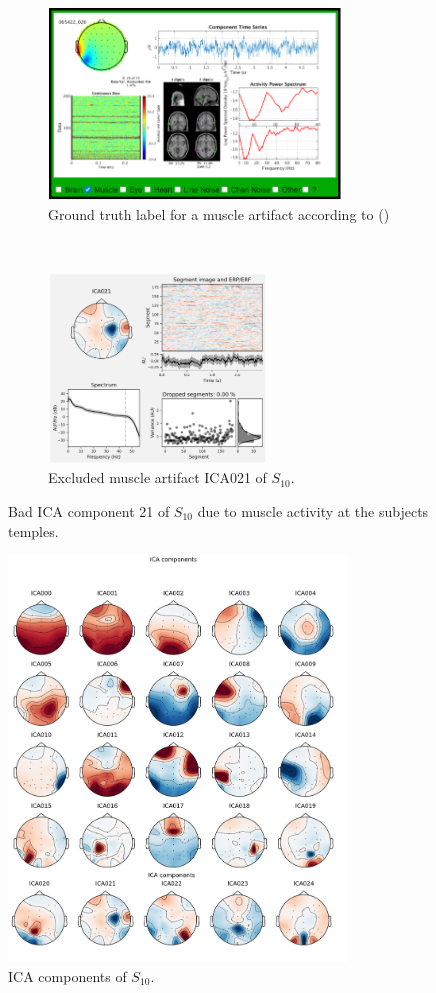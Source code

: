 \documentclass[a4paper]{article}
\newcommand{\caay}[2][]{
\citeauthor{#2} (\citeyear[#1]{#2})\xspace
}
\begin{document}
\begin{figure}[tbh!] 
\centering
 \begin{subfigure}[t]{0.5\textwidth}
        \centering
        \includegraphics[height=2.0in]{ica10AnalysisLabel.png}
\caption{Ground truth label for a muscle artifact according to \caay{pion-tonachini}}
\end{subfigure}%
    ~ 
\begin{subfigure}[t]{0.5\textwidth}
        \centering
        \includegraphics[height=2.0in]{ica10Analysis.png}
        \caption{Excluded muscle artifact ICA021 of $S_{10}$.}
\end{subfigure}
    \caption{Bad ICA component 21 of $S_{10}$ due to muscle activity at the subjects temples.}
     \label{fig:ica10Analysis}
\end{figure}


\begin{figure}[tbh!] 
  \centering
     \includegraphics[width=0.8\textwidth]{ica10.png}
  \caption{ICA components of $S_{10}$.}
  \label{fig:ica10}
\end{figure}
\end{document}
